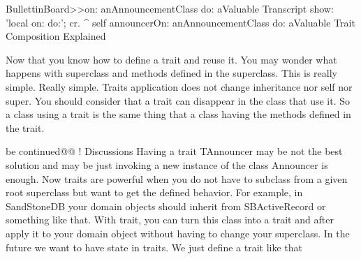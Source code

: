 BullettinBoard>>on: anAnnouncementClass do: aValuable
	Transcript show: 'local on: do:'; cr.
	^ self announcerOn: anAnnouncementClass do: aValuable
Trait Composition Explained

Now that you know how to define a trait and reuse it. You may wonder what happens with superclass and methods defined in the superclass. This is really simple. Really simple. Traits application does not change inheritance nor self nor super. You should consider that a trait can disappear in the class that use it. So a class using a trait is the same thing that a class having the methods defined in the trait.

be continued@@ ! Discussions Having a trait TAnnouncer may be not the best solution and may be just invoking a new instance of the class Announcer is enough. Now traits are powerful when you do not have to subclass from a given root superclass but want to get the defined behavior. For example, in SandStoneDB your domain objects should inherit from SBActiveRecord or something like that. With trait, you can turn this class into a trait and after apply it to your domain object without having to change your superclass. In the future we want to have state in traits. We just define a trait like that